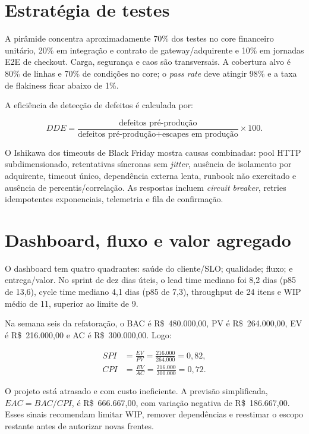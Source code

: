 \documentclass[12pt,openright,oneside,a4paper,brazil]{abntex2}
\begin{document}
\section{Estratégia de testes}

A pirâmide concentra aproximadamente 70\% dos testes no core financeiro unitário, 20\% em integração e contrato de gateway/adquirente e 10\% em jornadas E2E de checkout. Carga, segurança e caos são transversais. A cobertura alvo é 80\% de linhas e 70\% de condições no core; o \textit{pass rate} deve atingir 98\% e a taxa de flakiness ficar abaixo de 1\%.

A eficiência de detecção de defeitos é calculada por:

\begin{equation}
  DDE = \frac{\text{defeitos pré-produção}}{\text{defeitos pré-produção}+\text{escapes em produção}} \times 100.
\end{equation}

O Ishikawa dos timeouts de Black Friday mostra causas combinadas: pool HTTP subdimensionado, retentativas síncronas sem \textit{jitter}, ausência de isolamento por adquirente, timeout único, dependência externa lenta, runbook não exercitado e ausência de percentis/correlação. As respostas incluem \textit{circuit breaker}, retries idempotentes exponenciais, telemetria e fila de confirmação.

\section{Dashboard, fluxo e valor agregado}

O dashboard tem quatro quadrantes: saúde do cliente/SLO; qualidade; fluxo; e entrega/valor. No sprint de dez dias úteis, o lead time mediano foi 8,2 dias (p85 de 13,6), cycle time mediano 4,1 dias (p85 de 7,3), throughput de 24 itens e WIP médio de 11, superior ao limite de 9.

Na semana seis da refatoração, o BAC é R\$~480.000,00, PV é R\$~264.000,00, EV é R\$~216.000,00 e AC é R\$~300.000,00. Logo:

\begin{align}
 SPI &= \frac{EV}{PV} = \frac{216.000}{264.000} = 0{,}82,\\
 CPI &= \frac{EV}{AC} = \frac{216.000}{300.000} = 0{,}72.
\end{align}

O projeto está atrasado e com custo ineficiente. A previsão simplificada, $EAC = BAC/CPI$, é R\$~666.667,00, com variação negativa de R\$~186.667,00. Esses sinais recomendam limitar WIP, remover dependências e reestimar o escopo restante antes de autorizar novas frentes.
\end{document}
